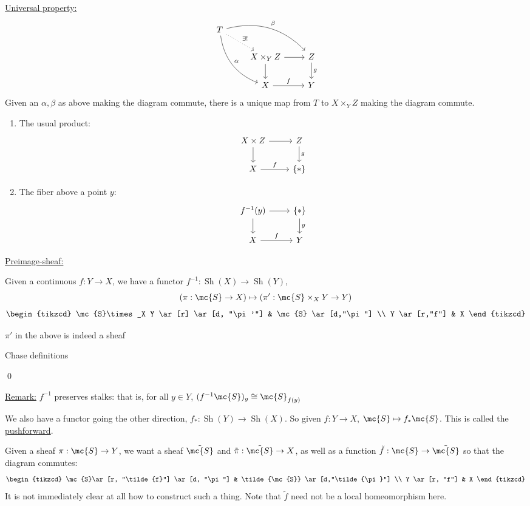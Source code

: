 \documentclass[x11names,reqno,14pt]{extarticle}
\DeclareMathOperator{\Sh}{Sh}
\begin{document}
\underline{Universal property:}
\[
\begin{tikzcd}
T \ar[drr, bend left = 30, "\beta"] \ar[dr,dotted,"\exists!"]\ar[ddr, bend right = 30, "\alpha"] & & \\
& X\times_Y Z \ar[r] \ar[d] & Z \ar[d,"g"] \\
& X \ar[r,"f"] & Y
\end{tikzcd}
\]
Given an $\alpha,\beta$ as above making the diagram commute, there is a unique map from $T$ to $X\times_YZ$ making the diagram commute. 
\exm
\,
\begin{enumerate}

\item The usual product:
\[
\begin{tikzcd}
X\times Z \ar[r] \ar[d] & Z \ar[d,"g"] \\
X \ar[r,"f"]& \{*\} 
\end{tikzcd}
\]

\item The fiber above a point $y$:
\[
\begin{tikzcd}
f^{-1}(y) \ar[r]\ar[d] & \{*\}\ar[d, "y"] \\
X \ar[r, "f"] & Y 
\end{tikzcd}
\]
\end{enumerate}

\underline{Preimage-sheaf:}

Given a continuous $f:Y\to X$, we have a functor $f^{-1}: \Sh(X)\to \Sh(Y)$, 
\[
(\pi:\mc{S}\to X) \mapsto (\pi':\mc{S}\times_X Y \to Y)
\]
\[
\begin{tikzcd}
\mc{S}\times_X Y \ar[r] \ar[d, "\pi'"] & \mc{S} \ar[d,"\pi"] \\
Y \ar[r,"f"] & X 
\end{tikzcd}
\]

\lem

$\pi'$ in the above is indeed a sheaf

\proof

Chase definitions

\qed

\underline{Remark:} $f^{-1}$ preserves stalks: that is, for all $y \in Y$, $(f^{-1}\mc{S})_y\cong \mc{S}_{f(y)}$

We also have a functor going the other direction, $f_*:\Sh(Y)\to\Sh(X)$. So given $f:Y\to X$, $\mc{S} \mapsto f_*\mc{S}$. This is called the \underline{pushforward}. 

Given a sheaf $\pi:\mc{S}\to Y$, we want a sheaf $\tilde{\mc{S}}$ and $\tilde{\pi}:\tilde{\mc{S}}\to X$, as well as a function $\tilde{f}:\mc{S}\to\tilde{\mc{S}}$ so that the diagram commutes:
\[
\begin{tikzcd}
\mc{S}\ar[r, "\tilde{f}"] \ar[d, "\pi"] & \tilde{\mc{S}} \ar[d,"\tilde{\pi}"] \\
Y \ar[r, "f"] & X
\end{tikzcd}
\]
It is not immediately clear at all how to construct such a thing. Note that $\tilde{f}$ need not be a local homeomorphism here. 
\end{document}
